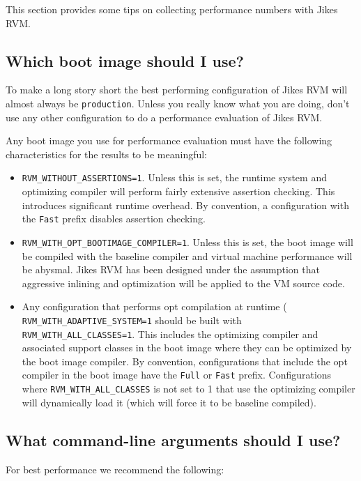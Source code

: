 This section provides some tips on collecting performance numbers with
Jikes RVM.\@

\subsection{Which boot image should I use?}

To make a long story short the best performing configuration of Jikes
RVM will almost always be {\tt production}.  Unless you really know
what you are doing, don't use any other configuration to do a
performance evaluation of Jikes RVM.\@ 

Any boot image you use for performance evaluation must have the
following characteristics for the results to be meaningful:
\begin{itemize} 
\item {\tt RVM\_WITHOUT\_ASSERTIONS=1}. Unless this is set, the runtime
system and optimizing compiler will perform fairly extensive assertion
checking. This introduces significant runtime overhead. By convention,
a configuration with the {\tt Fast} prefix disables assertion
checking.
\item {\tt RVM\_WITH\_OPT\_BOOTIMAGE\_COMPILER=1}. Unless this is set, the
boot image will be compiled with the baseline compiler and virtual
machine performance will be abysmal.  Jikes RVM has been designed
under the assumption that aggressive inlining and optimization will be
applied to the VM source code. 
\item Any configuration that performs opt compilation at runtime (
{\tt RVM\_\-WITH\_\-A\-DAP\-TIVE\_\-SYS\-TEM=1} should be built with {\tt
RVM\_\-WITH\_\-ALL\_\-CLAS\-SES=1}.  This includes the optimizing compiler and
associated support classes in the boot image where they can be
optimized by the boot image compiler. By convention, configurations
that include the opt compiler in the boot image have the {\tt Full} or
{\tt Fast} prefix.  Configurations where {\tt RVM\_WITH\_ALL\_CLASSES}
is not set to 1 that use the optimizing compiler will dynamically load
it (which will force it to be baseline compiled).
\end{itemize}

\subsection{What command-line arguments should I use?}

For best performance we recommend the following:

